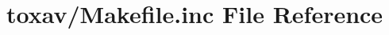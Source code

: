 \hypertarget{toxav_2_makefile_8inc}{\section{toxav/\+Makefile.inc File Reference}
\label{toxav_2_makefile_8inc}
}
